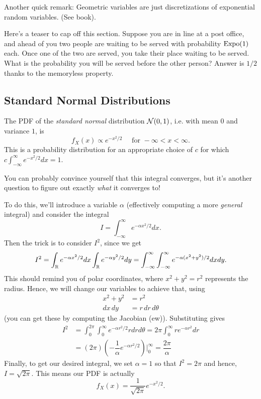 \documentclass[11 pt]{scrartcl}
\begin{document}
Another quick remark: Geometric variables are just discretizations of exponential random variables. (See book). 

Here's a teaser to cap off this section. Suppose you are in line at a post office, and ahead of you two people are waiting to be served with probability $\text{Expo}(1)$ each. Once one of the two are served, you take their place waiting to be served. What is the probability you will be served before the other person? Answer is $1/2$ thanks to the memoryless property. 

\subsection{Standard Normal Distributions}
\begin{definition}
    The PDF of the \emph{standard normal} distribution $\mathcal{N}(0,1)$, i.e. with mean $0$ and variance $1$, is 
    \[ f_X(x) \propto e^{-x^2/2} \quad \text{ for } -\infty < x < \infty.\] 
    This is a probability distribution for an appropriate choice of $c$ for which $c\int_{-\infty}^\infty e^{-x^2/2}dx = 1$. 
\end{definition}

You can probably convince yourself that this integral converges, but it's another question to figure out exactly \emph{what} it converges to! 

    To do this, we'll introduce a variable $\alpha$ (effectively computing a more \emph{general} integral) and consider the integral 
    \[ I = \int_{-\infty}^\infty e^{-\alpha x^2/2}dx.\] 
    Then the trick is to consider $I^2$, since we get 
    \[ I^2 = \int_{\mathbb R} e^{-\alpha x^2/2} dx \int_{\mathbb R} e^{-\alpha y^2/2} dy  = \int_{-\infty}^\infty \int_{-\infty}^\infty e^{-\alpha (x^2+y^2)/2}dxdy. \] 
    This should remind you of polar coordinates, where $x^2+y^2 = r^2$ represents the radius. Hence, we will change our variables to achieve that, using 
    \begin{align*} 
        x^2 + y^2 &= r^2 \\ 
        dx\, dy &= r\, dr\, d\theta 
    \end{align*}
    (you can get these by computing the Jacobian (ew)). Substituting gives 
\begin{align*} 
    I^2 &= \int_0^{2\pi}\int_0^{\infty} e^{-\alpha r^2/2} r dr d\theta = 2\pi\int_0^\infty re^{-\alpha r^2} dr  \\ 
        &= (2\pi) \left(-\dfrac{1}{\alpha}e^{-\alpha r^2/2}\right) \Big|^{\infty}_0 = \dfrac{2\pi}{\alpha} 
\end{align*}
    Finally, to get our desired integral, we set $\alpha = 1$ so that $I^2 = 2\pi$ and hence, $I = \sqrt{2\pi}$. This means our PDF is actually 
    \[ f_X(x) = \dfrac{1}{\sqrt{2\pi}} e^{-x^2/2}.\] 
\end{document}
